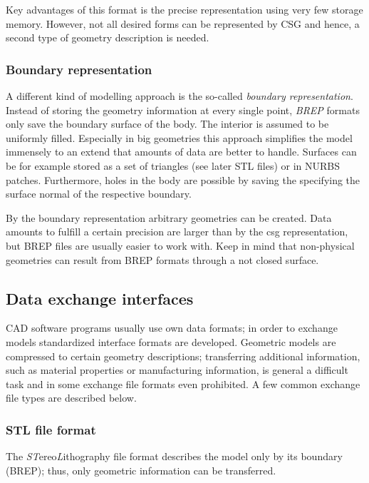 Key advantages of this format is the precise representation using very few storage memory. However, not all desired forms can be represented by CSG and hence, a second type of geometry description is needed. 
\subsubsection{Boundary representation}
A different kind of modelling approach is the so-called \emph{boundary representation}. Instead of storing the geometry information at every single point, \emph{BREP} formats only save the boundary surface of the body. The interior is assumed to be uniformly filled. Especially in big geometries this approach simplifies the model immensely to an extend that amounts of data are better to handle. Surfaces can be for example stored as a set of triangles (see later STL files) or in NURBS patches.
Furthermore, holes in the body are possible by saving the specifying the surface normal of the respective boundary. 

By the boundary representation arbitrary geometries can be created. Data amounts to fulfill a certain precision are larger than by the csg representation, but BREP files are usually easier to work with. Keep in mind that non-physical geometries can result from BREP formats through a not closed surface.
\subsection{Data exchange interfaces}
CAD software programs usually use own data formats; in order to exchange models standardized interface formats are developed. Geometric models are compressed to certain geometry descriptions; transferring additional information, such as material properties or manufacturing information, is general a difficult task and in some exchange file formats even prohibited. A few common exchange file types are described below.
\subsubsection{STL file format}
The \emph{ST}ereo\emph{L}ithography file format describes the model only by its boundary (BREP); thus, only geometric information can be transferred. 

